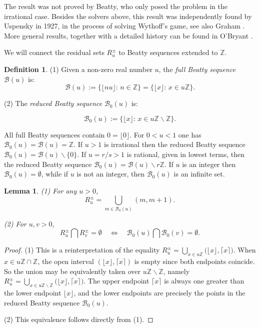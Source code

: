 \documentclass[12pt,letterpaper, reqno]{amsart}
\newtheorem{lem}[thm]{Lemma}
\theoremstyle{definition}
\newtheorem{defi}[thm]{Definition}
\theoremstyle{remark}
\newcommand{\ZZ}{\ensuremath{\mathbb{Z}}}
\newcommand{\R}{{R}}
\newcommand{\sB}{{\mathcal B}}
\newcommand{\floor}[1]{\lfloor{#1}\rfloor}
\newcommand{\ceil}[1]{\lceil{#1}\rceil}
\begin{document}
The result was not proved by Beatty, who only posed the problem in the irrational case.
Besides the solvers above, this result was  independently found  by Uspensky \cite{Usp27} in 1927, in the process of
solving Wythoff's game, see also Graham \cite{Gr63}. 
 More general results, together  with a detailed history can be found in O'Bryant \cite{OB03}.

We  will connect the residual sets $\R_u^{\pm}$ to Beatty sequences extended to  $\ZZ$.

\begin{defi}\label{def:45}
 (1) Given a non-zero real number $u$, the {\it  full Beatty sequence} $\sB(u)$
is:
$$
\sB(u) := \{ \lfloor n u \rfloor: \,  n \in \ZZ \} = \{ \lfloor x \rfloor: \,  x \in u\ZZ \} .
$$

(2) The  {\it reduced  Beatty sequence} $\sB_0(u)$ is: 

$$
\sB_0(u) := \{ \floor x : \,  x \in u\ZZ \smallsetminus \ZZ\} .
$$
\end{defi}

All full Beatty sequences contain $0 = \floor 0$. For $0 < u<1$ one  has $\sB_0(u) = \sB(u)= \ZZ$. 
If  $u>1$ is irrational   then  the reduced Beatty sequence
$\sB_0(u) = \sB(u) \smallsetminus \{0\}.$ If $u={r}/{s}>1$ is rational, 
given in lowest terms, then the reduced Beatty sequence
$\sB_0(u) = \sB(u) \smallsetminus r\ZZ.$ 
If   $u$ is an integer then $\sB_0(u) = \emptyset$, while if $u$ is not an integer, then $\sB_0(u)$ is an infinite set.

\begin{lem}\label{lem:46}
(1) For any $u >0$,
$$
\R_u^{\pm} = \bigcup_{m \in \sB_0(u)} ( m, m+1) .
$$

(2) For $u,v>0$,
\begin{equation}
\R_u^{\pm} \bigcap \R_v^{\pm} = \emptyset \quad \Leftrightarrow \quad \sB_0(u) \bigcap \sB_0(v) = \emptyset.
\end{equation}
\end{lem}

\begin{proof} 
(1) This is a reinterpretation of the equality $\R_u^{\pm} = \bigcup_{x\in u\ZZ} \big(\floor{x},\ceil{x} \big).$
When $x\in u\ZZ\cap \ZZ$, the open interval $(\floor x, \ceil x)$ is empty since both endpoints coincide. So the union may be equivalently taken over $u\ZZ\smallsetminus\ZZ$, namely $\R_u^{\pm} = \bigcup_{x\in u\ZZ\smallsetminus\ZZ} \big(\floor{x},\ceil{x} \big)$.
The upper endpoint $\ceil{x}$ is always one greater than the lower endpoint $\floor{x}$, and the lower endpoints are precisely the points in the reduced Beatty sequence $\sB_0(u)$.


(2) This equivalence follows directly from (1).
\end{proof}
\end{document}
